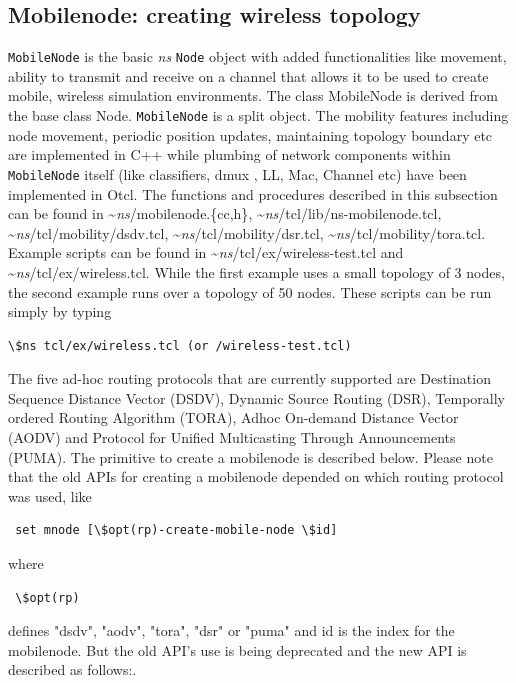 \subsection{Mobilenode: creating wireless topology}
\label{sec:mobilenode-creation}

{\tt MobileNode} is the basic \emph{ns} {\tt Node} object with added
functionalities like movement, ability to transmit and receive on a
channel that allows it to be used to create mobile, wireless simulation
environments. The class MobileNode is derived from the base class Node.
{\tt MobileNode} is a split object. The mobility features including node
movement, periodic position updates, maintaining topology boundary etc are
implemented in C++ while plumbing of network components within
{\tt MobileNode} itself (like classifiers, dmux , LL, Mac, Channel etc)
have been implemented in Otcl. The functions and procedures described in
this subsection can be found in \textasciitilde\emph{ns}/{mobilenode.\{cc,h\}},
\textasciitilde\emph{ns}/{tcl/lib/ns-mobilenode.tcl}, \textasciitilde\emph{ns}/{tcl/mobility/dsdv.tcl},
\textasciitilde\emph{ns}/{tcl/mobility/dsr.tcl}, \textasciitilde\emph{ns}/{tcl/mobility/tora.tcl}. Example scripts
can be found in
\textasciitilde\emph{ns}/{tcl/ex/wireless-test.tcl} and \textasciitilde\emph{ns}/{tcl/ex/wireless.tcl}. While the
first example uses a small topology of 3 nodes, the second example runs
over a topology of 50 nodes. These scripts can be run simply by typing

\begin{verbatim}
\$ns tcl/ex/wireless.tcl (or /wireless-test.tcl)
\end{verbatim} %

The five ad-hoc routing protocols that are currently supported are 
Destination Sequence Distance Vector (DSDV), Dynamic Source Routing
(DSR), Temporally ordered Routing Algorithm (TORA), Adhoc On-demand
Distance Vector (AODV) and Protocol for Unified Multicasting Through
Announcements (PUMA).
The primitive to create a mobilenode is described below. Please note 
that the old APIs for creating a mobilenode depended on which routing 
protocol was used, like 
\begin{verbatim} set mnode [\$opt(rp)-create-mobile-node \$id] \end{verbatim} 
where 
\begin{verbatim} \$opt(rp) \end{verbatim} 
defines "dsdv", "aodv", "tora", "dsr" or "puma" and id is the index for the mobilenode. But the old API's use is being deprecated and the new API is described as follows:.

